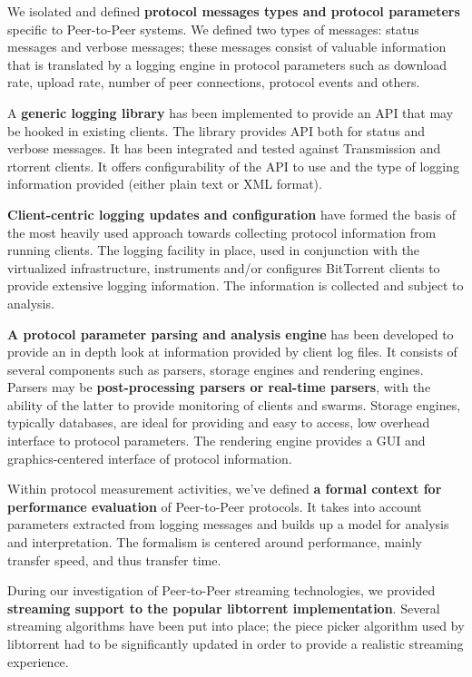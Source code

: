 We isolated and defined \textbf{protocol messages types and protocol
parameters} specific to Peer-to-Peer systems. We defined two types of
messages: status messages and verbose messages; these messages consist of
valuable information that is translated by a logging engine in protocol
parameters such as download rate, upload rate, number of peer connections,
protocol events and others.

A \textbf{generic logging library} has been implemented to provide an API that
may be hooked in existing clients. The library provides API both for status
and verbose messages. It has been integrated and tested against Transmission
and rtorrent clients. It offers configurability of the API to use and the type
of logging information provided (either plain text or XML format).

\textbf{Client-centric logging updates and configuration} have formed the
basis of the most heavily used approach towards collecting protocol
information from running clients. The logging facility in place, used in
conjunction with the virtualized infrastructure, instruments and/or configures
BitTorrent clients to provide extensive logging information. The information
is collected and subject to analysis.

\textbf{A protocol parameter parsing and analysis engine} has been developed
to provide an in depth look at information provided by client log files. It
consists of several components such as parsers, storage engines and rendering
engines. Parsers may be \textbf{post-processing parsers or real-time parsers},
with the ability of the latter to provide monitoring of clients and swarms.
Storage engines, typically databases, are ideal for providing and easy to
access, low overhead interface to protocol parameters. The rendering engine
provides a GUI and graphics-centered interface of protocol information.

Within protocol measurement activities, we've defined \textbf{a formal context
for performance evaluation} of Peer-to-Peer protocols. It takes into account
parameters extracted from logging messages and builds up a model for analysis
and interpretation. The formalism is centered around performance, mainly
transfer speed, and thus transfer time.

During our investigation of Peer-to-Peer streaming technologies, we provided
\textbf{streaming support to the popular libtorrent implementation}. Several
streaming algorithms have been put into place; the piece picker algorithm
used by libtorrent had to be significantly updated in order to provide a
realistic streaming experience.

